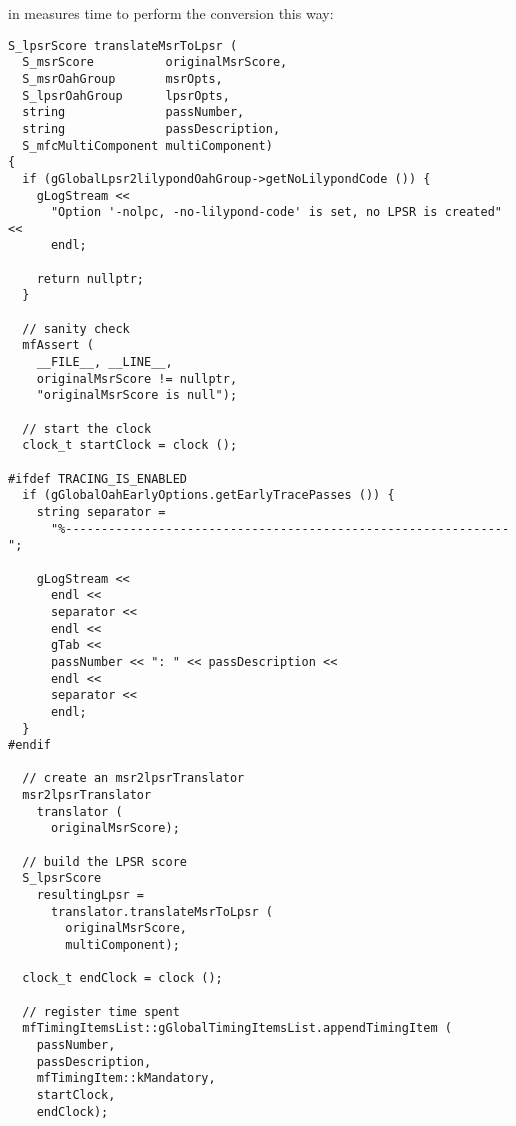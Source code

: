 \newpage

 in  measures time to perform the conversion this way:
\begin{lstlisting}[language=CPlusPlus]
S_lpsrScore translateMsrToLpsr (
  S_msrScore          originalMsrScore,
  S_msrOahGroup       msrOpts,
  S_lpsrOahGroup      lpsrOpts,
  string              passNumber,
  string              passDescription,
  S_mfcMultiComponent multiComponent)
{
  if (gGlobalLpsr2lilypondOahGroup->getNoLilypondCode ()) {
    gLogStream <<
      "Option '-nolpc, -no-lilypond-code' is set, no LPSR is created" <<
      endl;

    return nullptr;
  }

  // sanity check
  mfAssert (
    __FILE__, __LINE__,
    originalMsrScore != nullptr,
    "originalMsrScore is null");

  // start the clock
  clock_t startClock = clock ();

#ifdef TRACING_IS_ENABLED
  if (gGlobalOahEarlyOptions.getEarlyTracePasses ()) {
    string separator =
      "%--------------------------------------------------------------";

    gLogStream <<
      endl <<
      separator <<
      endl <<
      gTab <<
      passNumber << ": " << passDescription <<
      endl <<
      separator <<
      endl;
  }
#endif

  // create an msr2lpsrTranslator
  msr2lpsrTranslator
    translator (
      originalMsrScore);

  // build the LPSR score
  S_lpsrScore
    resultingLpsr =
      translator.translateMsrToLpsr (
        originalMsrScore,
        multiComponent);

  clock_t endClock = clock ();

  // register time spent
  mfTimingItemsList::gGlobalTimingItemsList.appendTimingItem (
    passNumber,
    passDescription,
    mfTimingItem::kMandatory,
    startClock,
    endClock);
\end{lstlisting}
